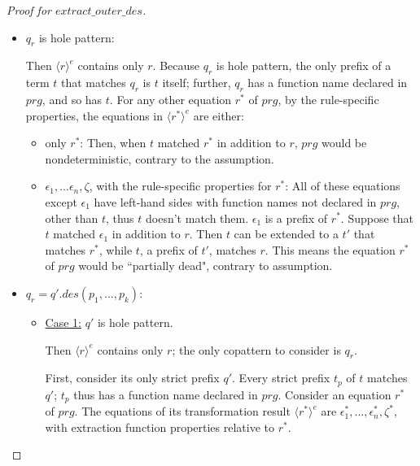 \documentclass[11pt]{article} %
\begin{document}
\begin{proof}[Proof for $extract\_outer\_des$]
\begin{itemize}
\item $q_r$ is hole pattern:

Then $\langle r \rangle^e$ contains only $r$. Because $q_r$ is hole pattern, the only prefix of a term $t$ that matches $q_r$ is $t$ itself; further, $q_r$ has a function name declared in $prg$, and so has $t$. For any other equation $r^*$ of $prg$, by the rule-specific properties, the equations in $\langle r^* \rangle^e$ are either:
\begin{itemize}
\item only $r^*$: Then, when $t$ matched $r^*$ in addition to $r$, $prg$ would be nondeterministic, contrary to the assumption.

\item $\epsilon_1, ... \epsilon_n, \zeta$, with the rule-specific properties for $r^*$: All of these equations except $\epsilon_1$ have left-hand sides with function names not declared in $prg$, other than $t$, thus $t$ doesn't match them. $\epsilon_1$ is a prefix of $r^*$. Suppose that $t$ matched $\epsilon_1$ in addition to $r$. Then $t$ can be extended to a $t'$ that matches $r^*$, while $t$, a prefix of $t'$, matches $r$. This means the equation $r^*$ of $prg$ would be ``partially dead", contrary to assumption.
\end{itemize}

\item $q_r = q'.des(p_1, ..., p_k)$:

\begin{itemize}
\item \underline{Case 1:} $q'$ is hole pattern.

Then $\langle r \rangle^e$ contains only $r$; the only copattern to consider is $q_r$.

First, consider its only strict prefix $q'$. Every strict prefix $t_p$ of $t$ matches $q'$; $t_p$ thus has a function name declared in $prg$. Consider an equation $r^*$ of $prg$. The equations of its transformation result $\langle r^* \rangle^e$ are $\epsilon^*_1, ..., \epsilon^*_n, \zeta^*$, with extraction function properties relative to $r^*$.


\end{itemize}
\end{itemize}
\end{proof}
\end{document}
